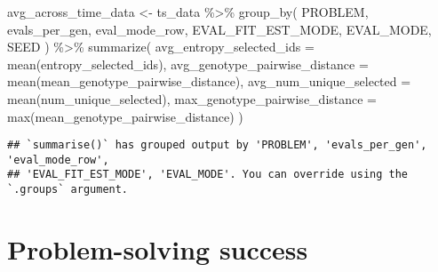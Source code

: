 \documentclass[
]{book}
\newenvironment{Shaded}{\begin{snugshade}}{\end{snugshade}}
\newcommand{\AttributeTok}[1]{\textcolor[rgb]{0.77,0.63,0.00}{#1}}
\newcommand{\FunctionTok}[1]{\textcolor[rgb]{0.00,0.00,0.00}{#1}}
\newcommand{\NormalTok}[1]{#1}
\newcommand{\OtherTok}[1]{\textcolor[rgb]{0.56,0.35,0.01}{#1}}
\newcommand{\SpecialCharTok}[1]{\textcolor[rgb]{0.00,0.00,0.00}{#1}}
\begin{document}
\begin{Shaded}
\begin{Highlighting}[]
\NormalTok{avg\_across\_time\_data }\OtherTok{\textless{}{-}}\NormalTok{ ts\_data }\SpecialCharTok{\%\textgreater{}\%}
  \FunctionTok{group\_by}\NormalTok{(}
\NormalTok{    PROBLEM,}
\NormalTok{    evals\_per\_gen,}
\NormalTok{    eval\_mode\_row,}
\NormalTok{    EVAL\_FIT\_EST\_MODE,}
\NormalTok{    EVAL\_MODE,}
\NormalTok{    SEED}
\NormalTok{  ) }\SpecialCharTok{\%\textgreater{}\%}
  \FunctionTok{summarize}\NormalTok{(}
    \AttributeTok{avg\_entropy\_selected\_ids =} \FunctionTok{mean}\NormalTok{(entropy\_selected\_ids),}
    \AttributeTok{avg\_genotype\_pairwise\_distance =} \FunctionTok{mean}\NormalTok{(mean\_genotype\_pairwise\_distance),}
    \AttributeTok{avg\_num\_unique\_selected =} \FunctionTok{mean}\NormalTok{(num\_unique\_selected),}
    \AttributeTok{max\_genotype\_pairwise\_distance =} \FunctionTok{max}\NormalTok{(mean\_genotype\_pairwise\_distance)}
\NormalTok{  )}
\end{Highlighting}
\end{Shaded}

\begin{verbatim}
## `summarise()` has grouped output by 'PROBLEM', 'evals_per_gen', 'eval_mode_row',
## 'EVAL_FIT_EST_MODE', 'EVAL_MODE'. You can override using the `.groups` argument.
\end{verbatim}

\hypertarget{problem-solving-success}{%
\section{Problem-solving success}\label{problem-solving-success}}
\end{document}
